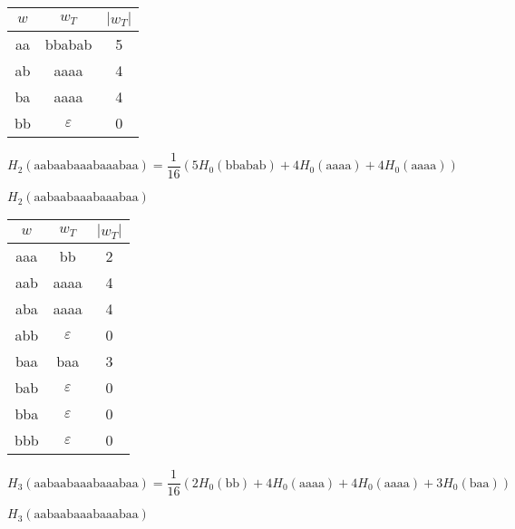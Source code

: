 \begin{figure}
  \begin{center}
  \begin{tabular}{c|c|c}
    $w$ & $w_T$ & $|w_T|$ \\
    \hline
    aa & bbabab & 5 \\
    ab & aaaa & 4 \\
    ba & aaaa & 4 \\
    bb & $\varepsilon$ & 0 \\
  \end{tabular}
  \end{center}
    $$H_{2}(\text{aabaabaaabaaabaa}) = \frac{1}{16} (5 H_{0}(\text{bbabab}) + 4 H_{0}(\text{aaaa}) + 4 H_{0}(\text{aaaa}))$$
  \caption{$H_{2}(\text{aabaabaaabaaabaa})$}
\end{figure}

\begin{figure}
  \begin{center}
  \begin{tabular}{c|c|c}
    $w$ & $w_T$ & $|w_T|$ \\
    \hline
    aaa & bb & 2 \\
    aab & aaaa & 4 \\
    aba & aaaa & 4 \\
    abb & $\varepsilon$ & 0 \\
    baa & baa & 3 \\
    bab & $\varepsilon$ & 0 \\
    bba & $\varepsilon$ & 0 \\
    bbb & $\varepsilon$ & 0 \\
  \end{tabular}
  \end{center}
    $$H_{3}(\text{aabaabaaabaaabaa}) = \frac{1}{16} (2 H_{0}(\text{bb}) + 4 H_{0}(\text{aaaa}) + 4 H_{0}(\text{aaaa}) + 3 H_{0}(\text{baa}))$$
  \caption{$H_{3}(\text{aabaabaaabaaabaa})$}
\end{figure}


